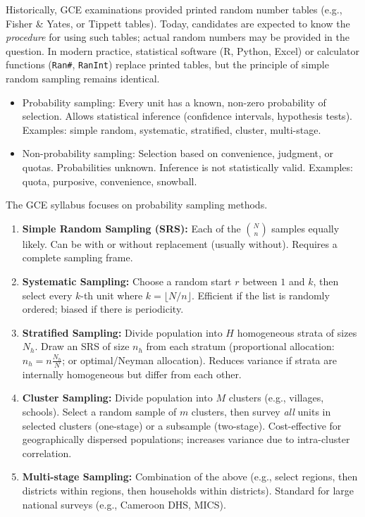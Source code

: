 \documentclass[11pt]{article}
\newcommand{\cle}[1]{{\popxbold\color{popdark}#1}}
\newcounter{popsec}
\newcounter{popsub}
\newcommand{\courssub}[1]{%
  \stepcounter{popsub}%
  \par\vspace{9pt}\noindent{\popxbold\fontsize{11.5}{13}\selectfont\color{popink}{\color{poporange}\thepopsec.\thepopsub}\hspace{6pt}#1}\par\nopagebreak\vspace{4pt}
}
\begin{document}
\begin{savaistu}
Historically, GCE examinations provided printed random number tables (e.g., Fisher \& Yates, or Tippett tables). Today, candidates are expected to know the \emph{procedure} for using such tables; actual random numbers may be provided in the question. In modern practice, statistical software (R, Python, Excel) or calculator functions (\texttt{Ran\#}, \texttt{RanInt}) replace printed tables, but the principle of simple random sampling remains identical.
\end{savaistu}

\courssub{Sampling Methods}

\begin{definition}
\begin{itemize}
\item \cle{Probability sampling}: Every unit has a known, non-zero probability of selection. Allows statistical inference (confidence intervals, hypothesis tests). Examples: simple random, systematic, stratified, cluster, multi-stage.
\item \cle{Non-probability sampling}: Selection based on convenience, judgment, or quotas. Probabilities unknown. Inference is not statistically valid. Examples: quota, purposive, convenience, snowball.
\end{itemize}
The GCE syllabus focuses on probability sampling methods.
\end{definition}

\begin{propriete}
\begin{enumerate}
\item \textbf{Simple Random Sampling (SRS):} Each of the $\binom{N}{n}$ samples equally likely. Can be with or without replacement (usually without). Requires a complete sampling frame.
\item \textbf{Systematic Sampling:} Choose a random start $r$ between $1$ and $k$, then select every $k$-th unit where $k = \lfloor N/n \rfloor$. Efficient if the list is randomly ordered; biased if there is periodicity.
\item \textbf{Stratified Sampling:} Divide population into $H$ homogeneous strata of sizes $N_h$. Draw an SRS of size $n_h$ from each stratum (proportional allocation: $n_h = n\frac{N_h}{N}$; or optimal/Neyman allocation). Reduces variance if strata are internally homogeneous but differ from each other.
\item \textbf{Cluster Sampling:} Divide population into $M$ clusters (e.g., villages, schools). Select a random sample of $m$ clusters, then survey \emph{all} units in selected clusters (one-stage) or a subsample (two-stage). Cost-effective for geographically dispersed populations; increases variance due to intra-cluster correlation.
\item \textbf{Multi-stage Sampling:} Combination of the above (e.g., select regions, then districts within regions, then households within districts). Standard for large national surveys (e.g., Cameroon DHS, MICS).
\end{enumerate}
\end{propriete}
\end{document}
